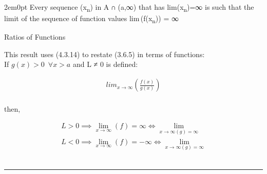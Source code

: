 2em0pt Every sequence ({x}\textsubscript{{n}}) in {A} ∩ ({a},∞) that has
lim({x}\textsubscript{{n}})=∞ is such that the limit of the sequence of
function values lim ({f}({x}\textsubscript{{n}})) = ∞

Ratios of Functions

This result uses (4.3.14) to restate (3.6.5) in terms of functions:\\
If \(g\left( x \right) > 0 \enspace \forall x > a\) and {L} ≠ 0 is
defined:

\[\begin{aligned} lim_{x\rightarrow
\infty}\left(
\frac{f\left( x
\right)}{g\left( x
\right)} \right)
\tag{4.3.15}
\label{4315}\end{aligned}\]\\

then,

\[\begin{aligned} L > 0
\implies
\lim_{x\rightarrow
\infty}\left( f \right) =
\infty \iff \lim_{x
\rightarrow \infty \left( g
\right) = \infty}
\tag{4.3.15 (i)} \label{4315i}
\\ L < 0 \implies
\lim_{x\rightarrow
\infty}\left( f \right) =
- \infty \iff \lim_{x
\rightarrow \infty \left( g
\right) = \infty}
\tag{4.3.15 (ii)}
\label{4315ii}\end{aligned}\]\\

\hfill\break

\begin{center}\rule{0.5\linewidth}{0.5pt}\end{center}
